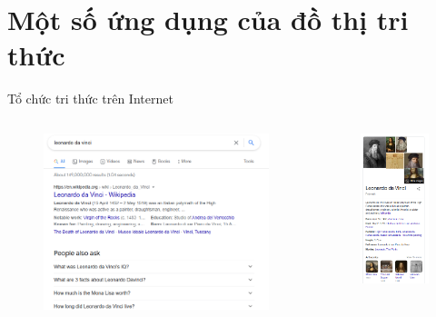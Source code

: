 \documentclass[notheorems, aspectratio=54]{beamer}
\begin{document}
	\section{Một số ứng dụng của đồ thị tri thức}
	\begin{frame}{Tổ chức tri thức trên Internet}
		\begin{columns}
			\begin{column}{0.5\textwidth}
				\begin{figure}[H]
					\includegraphics[width=1\linewidth]{figs/search_01.png}
				\end{figure}
			\end{column}
			\begin{column}{0.5\textwidth}
				\begin{figure}[H]
					\includegraphics[width=0.5\linewidth]{figs/search_02.png}
				\end{figure}
			\end{column}
		\end{columns}
	\end{frame}
\end{document}

